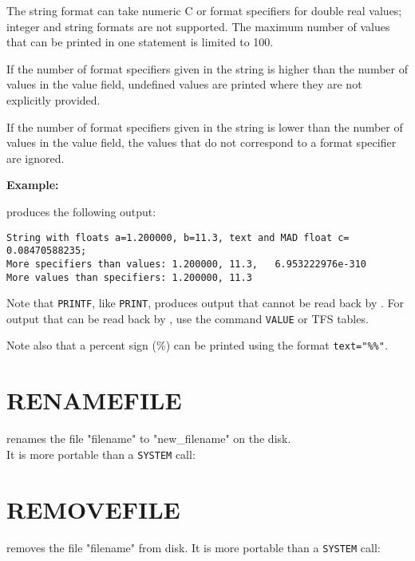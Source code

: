 The string format can take numeric C or \madx format specifiers for
double real values; integer and string formats are not supported. 
The maximum number of values that can be printed in one
statement is limited to 100. 

If the number of format specifiers given in the string is higher 
than the number of values in the value field, undefined values are printed 
where they are not explicitly provided. 

If the number of format specifiers given in the string is lower 
than the number of values in the value field, the values that 
do not correspond to a format specifier are ignored. 


{\bf Example:}

produces the following output:
\begin{verbatim}
String with floats a=1.200000, b=11.3, text and MAD float c=     0.08470588235;
More specifiers than values: 1.200000, 11.3,   6.953222976e-310
More values than specifiers: 1.200000, 11.3
\end{verbatim}

Note that \texttt{PRINTF}, like \texttt{PRINT}, produces output that
cannot be read back by \madx. For output that can be read back by \madx,
use the command \texttt{VALUE} or TFS tables.

Note also that a percent sign (\%) can be printed using the format
\verb|text="%%"|. 


\section{RENAMEFILE}
\label{sec:renamefile}
renames the file "filename" to "new\_filename" on the disk. \\
It is more portable than a {\tt SYSTEM} call:

\section{REMOVEFILE}
\label{sec:removefile}
removes the file "filename" from disk.
It is more portable than a {\tt SYSTEM} call: 




